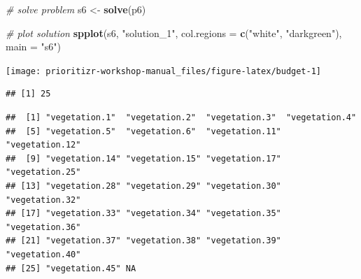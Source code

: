 \documentclass[12pt,]{book}
\newenvironment{Shaded}{\begin{snugshade}}{\end{snugshade}}
\newcommand{\KeywordTok}[1]{\textcolor[rgb]{0.13,0.29,0.53}{\textbf{#1}}}
\newcommand{\DataTypeTok}[1]{\textcolor[rgb]{0.13,0.29,0.53}{#1}}
\newcommand{\FloatTok}[1]{\textcolor[rgb]{0.00,0.00,0.81}{#1}}
\newcommand{\StringTok}[1]{\textcolor[rgb]{0.31,0.60,0.02}{#1}}
\newcommand{\CommentTok}[1]{\textcolor[rgb]{0.56,0.35,0.01}{\textit{#1}}}
\newcommand{\OtherTok}[1]{\textcolor[rgb]{0.56,0.35,0.01}{#1}}
\newcommand{\OperatorTok}[1]{\textcolor[rgb]{0.81,0.36,0.00}{\textbf{#1}}}
\newcommand{\NormalTok}[1]{#1}
\begin{document}
\begin{Shaded}
\begin{Highlighting}[]
\CommentTok{# solve problem}
\NormalTok{s6 <-}\StringTok{ }\KeywordTok{solve}\NormalTok{(p6)}

\CommentTok{# plot solution}
\KeywordTok{spplot}\NormalTok{(s6, }\StringTok{"solution_1"}\NormalTok{, }\DataTypeTok{col.regions =} \KeywordTok{c}\NormalTok{(}\StringTok{"white"}\NormalTok{, }\StringTok{"darkgreen"}\NormalTok{), }\DataTypeTok{main =} \StringTok{"s6"}\NormalTok{)}
\end{Highlighting}
\end{Shaded}

\begin{center}\texttt{[image: prioritizr-workshop-manual\_files/figure-latex/budget-1]} \end{center}

\begin{Shaded}
\end{Shaded}

\begin{verbatim}
## [1] 25
\end{verbatim}

\begin{Shaded}
\end{Shaded}

\begin{verbatim}
##  [1] "vegetation.1"  "vegetation.2"  "vegetation.3"  "vegetation.4" 
##  [5] "vegetation.5"  "vegetation.6"  "vegetation.11" "vegetation.12"
##  [9] "vegetation.14" "vegetation.15" "vegetation.17" "vegetation.25"
## [13] "vegetation.28" "vegetation.29" "vegetation.30" "vegetation.32"
## [17] "vegetation.33" "vegetation.34" "vegetation.35" "vegetation.36"
## [21] "vegetation.37" "vegetation.38" "vegetation.39" "vegetation.40"
## [25] "vegetation.45" NA
\end{verbatim}
\end{document}
